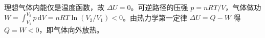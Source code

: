 理想气体内能仅是温度函数，故 $\Delta U=0$。可逆路径的压强 $p=nRT/V$，气体做功 $W=\int_{V_1}^{V_2}p\,\mathrm dV=nRT\ln(V_2/V_1)<0$。由热力学第一定律 $\Delta U=Q-W$ 得 $Q=W<0$，即气体向外放热。
